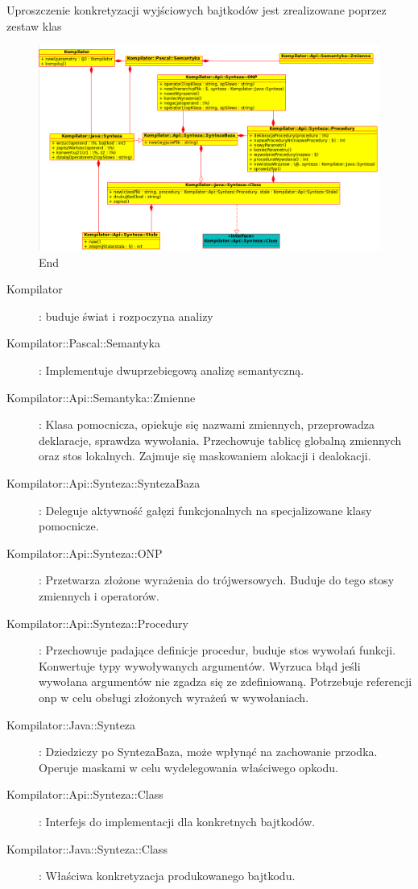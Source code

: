 \documentclass[a4paper,12pt]{article}
\begin{document}
Uproszczenie konkretyzacji wyjściowych bajtkodów jest zrealizowane poprzez zestaw klas
\begin{figure}[h!]
   \includegraphics[width=15cm]{grafika/model/end2.png}
   \caption{End}
\end{figure}
\begin{description}
	\item[Kompilator]: buduje świat i rozpoczyna analizy
	\item[Kompilator::Pascal::Semantyka]: Implementuje dwuprzebiegową analizę semantyczną.
	\item[Kompilator::Api::Semantyka::Zmienne]: Klasa pomocnicza, opiekuje się nazwami zmiennych, przeprowadza deklaracje, sprawdza wywołania. Przechowuje tablicę globalną zmiennych oraz stos lokalnych. Zajmuje się maskowaniem alokacji i dealokacji.
	\item[Kompilator::Api::Synteza::SyntezaBaza]: Deleguje aktywność gałęzi funkcjonalnych na specjalizowane klasy pomocnicze.
	\item[Kompilator::Api::Synteza::ONP]: Przetwarza złożone wyrażenia do trójwersowych. Buduje do tego stosy zmiennych i operatorów. 
	\item[Kompilator::Api::Synteza::Procedury]: Przechowuje padające definicje procedur, buduje stos wywołań funkcji. Konwertuje typy wywoływanych argumentów. Wyrzuca błąd jeśli wywołana argumentów nie zgadza się ze zdefiniowaną. Potrzebuje referencji onp w celu obsługi złożonych wyrażeń w wywołaniach.
	\item[Kompilator::Java::Synteza]: Dziedziczy po SyntezaBaza, może wpłynąć na zachowanie przodka. Operuje maskami w celu wydelegowania właściwego opkodu.
	\item[Kompilator::Api::Synteza::Class]: Interfejs do implementacji dla konkretnych bajtkodów.
	\item[Kompilator::Java::Synteza::Class]: Właściwa konkretyzacja produkowanego bajtkodu.
\end{description}
\end{document}

